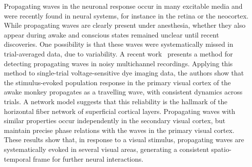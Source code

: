 \documentclass[brainsci, %
               review,submit,pdftex,moreauthors
               ]{Definitions/mdpi}
\begin{document}
Propagating waves in the neuronal response occur in many excitable media and were recently found in neural systems, for instance in the retina or the neocortex. While propagating waves are clearly present under anesthesia, whether they also appear during awake and conscious states remained unclear until recent discoveries. One possibility is that these waves were systematically missed in trial-averaged data, due to variability. A recent work~\citep{muller_stimulus-evoked_2014} presents a method for detecting propagating waves in noisy multichannel recordings. Applying this method to single-trial voltage-sensitive dye imaging data, the authors show that the stimulus-evoked population response in the primary visual cortex of the awake monkey propagates as a travelling wave, with consistent dynamics across trials. A network model suggests that this reliability is the hallmark of the horizontal fiber network of superficial cortical layers. Propagating waves with similar properties occur independently in the secondary visual cortex, but maintain precise phase relations with the waves in the primary visual cortex. These results show that, in response to a visual stimulus, propagating waves are systematically evoked in several visual areas, generating a consistent spatio-temporal frame for further neural interactions.

\end{document}
